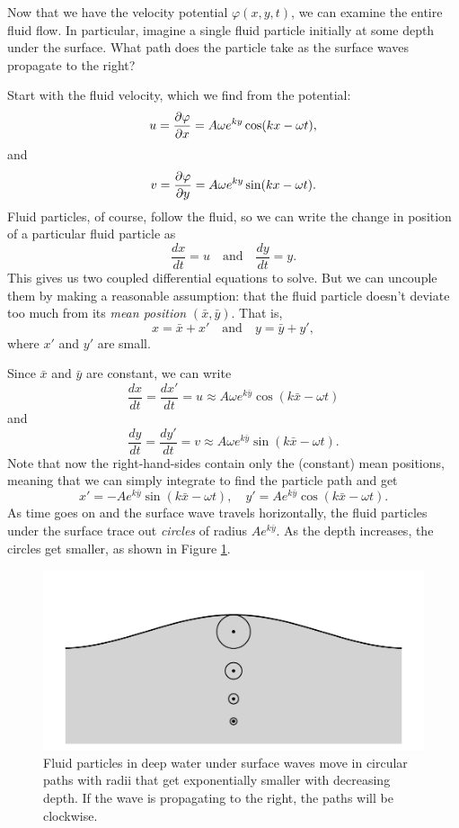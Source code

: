 \begin{example}

Now that we have the velocity potential $\varphi(x, y, t)$, we can examine the entire fluid flow.  In particular, imagine a single fluid particle initially at some depth under the surface.  What path does the particle take as the surface waves propagate to the right?

Start with the fluid velocity, which we find from the potential:
\[
u = \frac{\partial {\varphi}}{\partial {x}} = A \omega e^{ky} \cos (kx - \omega t),
\]
and
\[
v = \frac{\partial {\varphi}}{\partial {y}} = A \omega e^{ky} \sin (kx - \omega t).
\]
Fluid particles, of course, follow the fluid, so we can write the change in position of a particular fluid particle as
\[
\frac{dx}{dt} = u \quad \text{and} \quad \frac{dy}{dt} = y.
\]
This gives us two coupled differential equations to solve.  But we can uncouple them by making a reasonable assumption:  that the fluid particle doesn't deviate too much from its \emph{mean position} $(\bar{x}, \bar{y})$.  That is, 
\[
x = \bar{x} + x'  \quad \text{and} \quad y = \bar{y} + y',
\]
where $x'$ and $y'$ are small.

Since $\bar{x}$ and $\bar{y}$ are constant, we can write
\[
\frac{dx}{dt} = \frac{dx'}{dt} = u \approx A \omega e^{k\bar{y}} \cos (k \bar{x} - \omega t)
\]
and 
\[
\frac{dy}{dt} = \frac{dy'}{dt} = v \approx A \omega e^{k\bar{y}} \sin (k \bar{x} - \omega t).
\]
Note that now the right-hand-sides contain only the (constant) mean positions, meaning that we can simply integrate to find the particle path and get
\begin{equation}
x' = -A e^{k\bar{y}} \sin(k\bar{x} - \omega t), \quad  y' = A e^{k\bar{y}} \cos (k\bar{x} - \omega t).
\end{equation}
As time goes on and the surface wave travels horizontally, the fluid particles under the surface trace out \emph{circles} of radius $Ae^{k\bar{y}}$.  As the depth increases, the circles get smaller, as shown in Figure \ref{fig_circle_paths}.

\end{example}


\begin{figure}
\centering\includegraphics[width=0.8\linewidth]{Figures/Chapter5/fig_circle_paths}
\caption{Fluid particles in deep water under surface waves move in circular paths with radii that get exponentially smaller with decreasing depth.  If the wave is propagating to the right, the paths will be clockwise.}
\label{fig_circle_paths}
\end{figure}

